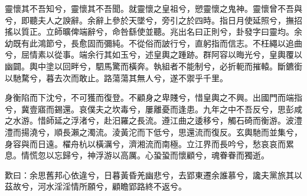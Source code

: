 
\begin{pinyinscope}
靈懷其不吾知兮，靈懷其不吾聞。就靈懷之皇祖兮，愬靈懷之鬼神。靈懷曾不吾與兮，即聽夫人之諛辭。余辭上參於天墜兮，旁引之於四時。指日月使延照兮，撫招搖以質正。立師曠俾端辭兮，命咎繇使並聽。兆出名曰正則兮，卦發字曰靈均。余幼既有此鴻節兮，長愈固而彌純。不從俗而詖行兮，直躬指而信志。不枉繩以追曲兮，屈情素以從事。端余行其如玉兮，述皇輿之踵跡。群阿容以晦光兮，皇輿覆以幽闢。輿中塗以回畔兮，駟馬驚而橫奔。執組者不能制兮，必折軛而摧轅。斷鑣銜以馳騖兮，暮去次而敢止。路蕩蕩其無人兮，遂不禦乎千里。

身衡陷而下沈兮，不可獲而復登。不顧身之卑賤兮，惜皇輿之不興。出國門而端指兮，冀壹寤而錫還。哀僕夫之坎毒兮，屢離憂而逢患。九年之中不吾反兮，思彭咸之水游。惜師延之浮渚兮，赴汨羅之長流。遵江曲之逶移兮，觸石碕而衡游。波澧澧而揚澆兮，順長瀨之濁流。淩黃沱而下低兮，思還流而復反。玄輿馳而並集兮，身容與而日遠。櫂舟杭以橫濿兮，濟湘流而南極。立江界而長吟兮，愁哀哀而累息。情慌忽以忘歸兮，神浮游以高厲。心蛩蛩而懷顧兮，魂眷眷而獨逝。

歎曰：余思舊邦心依違兮，日暮黃昏羌幽悲兮，去郢東遷余誰慕兮，讒夫黨旅其以茲故兮，河水淫淫情所願兮，顧瞻郢路終不返兮。


\end{pinyinscope}